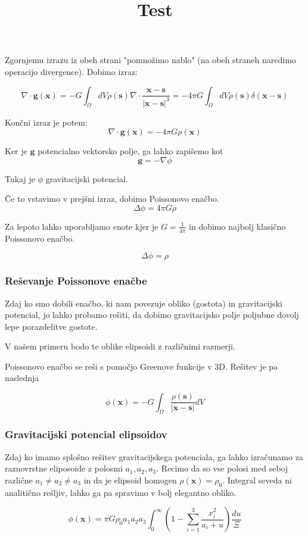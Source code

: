 \documentclass{article}
\theoremstyle{definition}
\theoremstyle{plain}
\numberwithin{definition}{section}
\numberwithin{theorem}{section} \title{Test}
\begin{document}
Zgornjemu izrazu iz obeh strani "pomnožimo nablo" (na obeh straneh naredimo
operacijo divergence). Dobimo izraz:

$$\nabla \cdot \boldsymbol{g}(\boldsymbol{x}) = 
-G \int_{\Omega} dV \rho(\boldsymbol{s}) \nabla \cdot \frac{\boldsymbol{x} - \boldsymbol{s}}{|\boldsymbol{x} - \boldsymbol{s}|^{3}} = - 4 \pi G \int_{\Omega} dV \rho(\boldsymbol{s}) \delta(\boldsymbol{x} - \boldsymbol{s})$$

Končni izraz je potem:
$$\nabla \cdot \boldsymbol{g}(\boldsymbol{x}) = -4 \pi G \rho(\boldsymbol{x})$$

Ker je $\boldsymbol{g}$ potencialno vektorsko polje, ga lahko zapišemo kot
$$\boldsymbol{g} = - \nabla \phi$$

Tukaj je $\phi$ gravitacijski potencial.

Če to vstavimo v prejšni izraz, dobimo Poissonovo enačbo.
$$\Delta \phi = 4 \pi G \rho$$

Za lepoto lahko uporabljamo enote kjer je $G = \frac{1}{4 \pi}$ in dobimo najbolj
klasično Poissonovo enačbo.

$$\Delta \phi = \rho$$

\subsubsection{Reševanje Poissonove enačbe}
Zdaj ko smo dobili enačbo, ki nam povezuje obliko (gostota)
in gravitacijski potencial, jo lahko probamo rešiti, da dobimo 
gravitacijsko polje poljubne dovolj lepe porazdelitve gostote.

V našem primeru bodo te oblike elipsoidi z različnimi razmerji.

Poissonovo enačbo se reši s pomočjo Greenove funkcije v 3D. Rešitev je pa
naslednja

$$\phi(\boldsymbol{x}) = -G \int_{\Omega} \frac{\rho(\boldsymbol{s})}{|\boldsymbol{x} - \boldsymbol{s}|}dV$$

\subsubsection{Gravitacijski potencial elipsoidov}
Zdaj ko imamo splošno rešitev gravitacijskega potenciala, ga lahko izračunamo za
raznovrstne eliposoide z polosmi $a_1, a_2, a_3$. Recimo da so vse polosi 
med seboj različne $a_1 \neq a_2 \neq a_3$ in da je
elipsoid homogen $\rho(\boldsymbol{x}) = \rho_0$. 
Integral seveda ni analitično 
rešljiv, lahko ga pa spravimo v bolj elegantno obliko.

$$\phi(\boldsymbol{x}) = \pi G \rho_0 a_1 a_2 a_3 
\int_{0}^{\infty} \left(1 - 
\sum_{i = 1}^{3} \frac{x_{i}^{2}}{a_{i} + u} \right) 
\frac{du}{\Xi}$$
\end{document}
